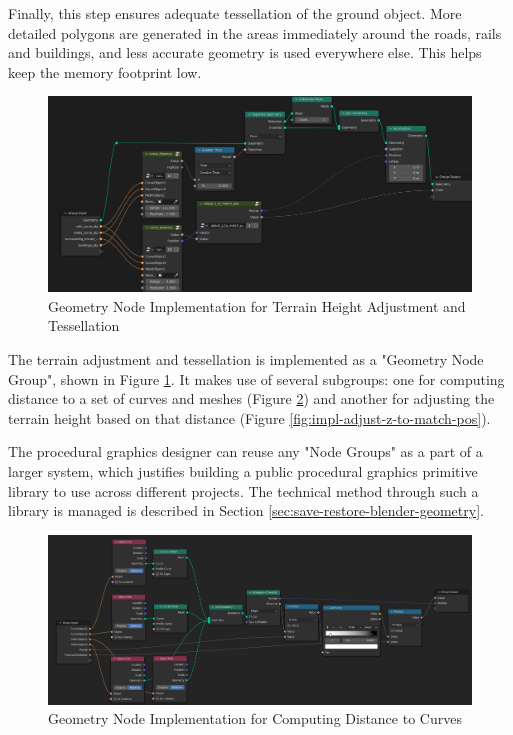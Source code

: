 Finally, this step ensures adequate tessellation of the ground object. More detailed polygons are generated in the areas immediately around the roads, rails and buildings, and less accurate geometry is used everywhere else. This helps keep the memory footprint low.

\begin{figure}[H]
    \centering
    \includegraphics[width=14.5cm]{src/img/pic/pic-2 screenshot of blender adjust terrain geometry node.png}
    \caption{Geometry Node Implementation for Terrain Height Adjustment and Tessellation}
    \label{fig:impl-geom-nodes-terrain}
\end{figure}


The terrain adjustment and tessellation is implemented as a "Geometry Node Group", shown in Figure \ref{fig:impl-geom-nodes-terrain}. It makes use of several subgroups: one for computing distance to a set of curves and meshes (Figure \ref{fig:impl-curve-dist}) and another for adjusting the terrain height based on that distance (Figure \ref{fig:impl-adjust-z-to-match-pos}).

The procedural graphics designer can reuse any "Node Groups" as a part of a larger system, which justifies building a public procedural graphics primitive library to use across different projects. The technical method through such a library is managed is described in Section \ref{sec:save-restore-blender-geometry}.

\begin{figure}[H]
    \centering
    \includegraphics[width=14.5cm]{src/img/pic/pic-3 blender geometry screenshot curve_distance.png}
    \caption{Geometry Node Implementation for Computing Distance to Curves}
    \label{fig:impl-curve-dist}
\end{figure}

